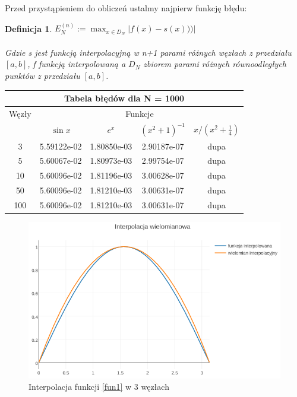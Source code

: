 \documentclass{article}
\newtheorem{defi}{Definicja}
\begin{document}
Przed przystąpieniem do obliczeń ustalmy najpierw funkcję błędu:
\begin{defi}\label{Error}
	$E_N^{(n)} := \max_{x \in D_N}|f(x)-s(x)))|$ \\
	\\
	Gdzie s jest funkcją interpolacyjną w n+1 parami różnych węzłach z przedziału $[a,b]$, f funkcją interpolowaną a $D_N$ zbiorem parami różnych równoodległych punktów z przedziału $[a,b]$.
\end{defi}

\renewcommand{\arraystretch}{1.5}  
\begin{center}
	\begin{tabular}{||c||c|c|c|c||} \hline
		\multicolumn{5}{||c||}{Tabela błędów dla N = 1000} \\ \hline
		Węzły 	& \multicolumn{4}{|c||}{Funkcje} \\ \cline{2-5}
				& $\sin x$ & $e^x$ & $(x^{2}+1)^{-1}$ & $x/(x^{2} + \frac{1}{4})$ \\ \hline					
		3 		& 5.59122e-02 &  1.80850e-03 &  2.90187e-07 & dupa\\\hline
		5 		& 5.60067e-02 &  1.80973e-03 &  2.99754e-07 & dupa\\\hline
		10  	& 5.60096e-02 &  1.81196e-03 &  3.00628e-07 & dupa\\\hline
		50  	& 5.60096e-02 &  1.81210e-03 &  3.00631e-07 & dupa\\\hline
		100  	& 5.60096e-02 &  1.81210e-03 &  3.00631e-07 & dupa\\\hline
	\end{tabular}

\end{center}
\renewcommand{\arraystretch}{1}

\begin{figure}[ht]
	\begin{center}
		\includegraphics[width=13cm]{lagrange_sin}
	\end{center}
	\caption{Interpolacja funkcji \eqref{fun1} w 3 węzłach}
	\label{fig:rysunek1}
\end{figure}
\end{document}
